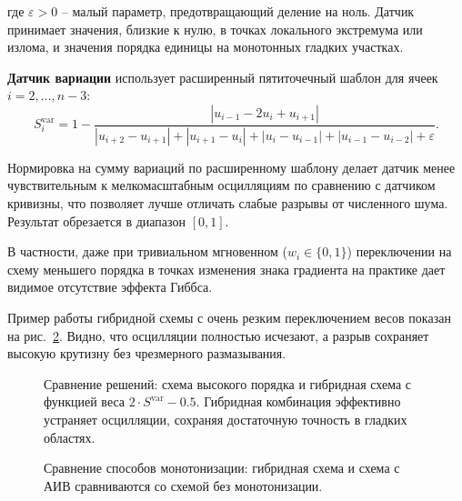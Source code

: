\documentclass[14pt]{report}
\begin{document}
где $\varepsilon > 0$ -- малый параметр, предотвращающий деление на ноль. Датчик принимает значения, близкие к нулю, в точках локального экстремума или излома, и значения порядка единицы на монотонных гладких участках.

\textbf{Датчик вариации} использует расширенный пятиточечный шаблон для ячеек $i = 2,\dots,n-3$:
\begin{equation}
S_i^{\text{var}} = 1 - \frac{|u_{i-1} - 2u_i + u_{i+1}|}{|u_{i+2} - u_{i+1}| + |u_{i+1} - u_i| + |u_i - u_{i-1}| + |u_{i-1} - u_{i-2}| + \varepsilon}.
\end{equation}

Нормировка на сумму вариаций по расширенному шаблону делает датчик менее чувствительным к мелкомасштабным осцилляциям по сравнению с датчиком кривизны, что позволяет лучше отличать слабые разрывы от численного шума. Результат обрезается в диапазон $[0, 1]$.

В частности, даже при тривиальном мгновенном ($w_i \in \{0, 1\}$) переключении на схему меньшего порядка в точках изменения знака градиента на практике дает видимое отсутствие эффекта Гиббса.

Пример работы гибридной схемы с очень резким переключением весов показан на рис.~\ref{fig:hybrid}. Видно, что осцилляции полностью исчезают, а разрыв сохраняет высокую крутизну без чрезмерного размазывания.

\begin{figure}[ht]
    \centering
    
    \caption{Сравнение решений: схема высокого порядка и гибридная схема с функцией веса $2\cdot S^{\text{var}} - 0.5$. Гибридная комбинация эффективно устраняет осцилляции, сохраняя достаточную точность в гладких областях.}
    \label{fig:hybrid}
\end{figure}

\begin{table}[h]
    \centering
    
    
    
    \label{tab:hybrid-global-erros}
    \caption{Интегральные ошибки в норме $L_2$ различных схем (с разными датчиками осцилляций) на различных профилях.}
\end{table}

\begin{figure}[ht]
    \centering
    
    \caption{Сравнение способов монотонизации: гибридная схема и схема с АИВ сравниваются со схемой без монотонизации.}
    \label{fig:hybrid}
\end{figure}
\end{document}
